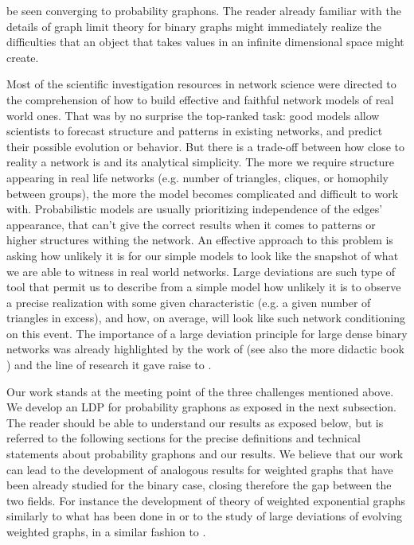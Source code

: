 \documentclass[12pt,twoside,a4paper]{article}
\begin{document}
be seen converging to probability graphons. The reader already familiar with the details of graph limit theory for binary graphs might immediately realize the difficulties that an object that takes values in an infinite dimensional space might create. 

Most of the scientific investigation resources in network science were directed to the comprehension of how to build effective and faithful network models of real world ones. That was by no surprise the top-ranked task: good models allow scientists to forecast structure and patterns in existing networks, and predict their possible evolution or behavior. But there is a trade-off between how close to reality a network is and its analytical simplicity. The more we require structure appearing in real life networks (e.g. number of triangles, cliques, or homophily between groups), the more the model becomes complicated and difficult to work with. Probabilistic models are usually prioritizing independence of the edges' appearance, that can't give the correct results when it comes to patterns or higher structures withing the network. An effective approach to this problem is asking how unlikely it is for our simple models to look like the snapshot of what we are able to witness in real world networks. Large deviations are such type of tool that permit us to describe from a simple model how unlikely it is to observe a precise realization with some given characteristic (e.g. a given number of triangles in excess), and how, on average, will look like such network conditioning on this event. The importance of a large deviation principle for large dense binary networks was already highlighted by the work of \cite{ChatterjeeVaradhan2011} (see also the more didactic book \cite{chatterjee2017large}) and the line of research it gave raise to \cite{grebik2023large,Borgs_Chayes_Gaudio_Petti_Sen_2025,lubetzky2015replica,ChatterjeeDiaconisExponential2013,chatterjeeRandomGraphsGiven2011b,bhamidi2008mixing,Den_Hollander_Markering_2023,radinPhaseTransitionsExponential2013b,10.1214/18-EJP135}.

Our work stands at the meeting point of the three challenges mentioned above. We develop an LDP for probability graphons as exposed in the next subsection. The reader should be able to understand our results as exposed below, but is referred to the following sections for the precise definitions and technical statements about probability graphons and our results. We believe that our work can lead to the development of analogous results for weighted graphs that have been already studied for the binary case, closing therefore the gap between the two fields. For instance the development of theory of weighted exponential graphs similarly to what has been done in \cite{WILSON201737,bhamidiWeightedExponentialRandom2018} or to the study of large deviations of evolving weighted graphs, in a similar fashion to \cite{braunsteinsSamplepathLargeDeviation2023,bhamidi2025large}.
\end{document}
